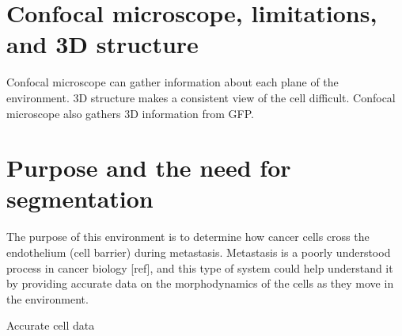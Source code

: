 \section{Confocal microscope, limitations, and 3D structure}

Confocal microscope can gather information about each plane of the environment.
3D structure makes a consistent view of the cell difficult.
Confocal microscope also gathers 3D information from GFP.

\section{Purpose and the need for segmentation}

The purpose of this environment is to determine how cancer cells cross the endothelium (cell barrier) during metastasis. Metastasis is a poorly understood process in cancer biology [ref], and this type of system could help understand it by providing accurate data on the morphodynamics of the cells as they move in the environment.

Accurate cell data
